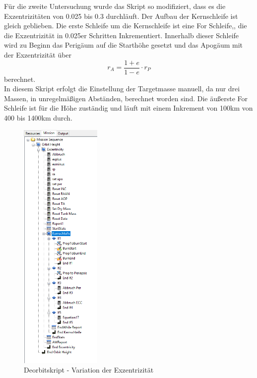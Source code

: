 Für die zweite Untersuchung wurde das Skript so modifiziert, dass es die Exzentrizitäten von 0.025 bis 0.3 durchläuft.
Der Aufbau der Kernschleife ist gleich geblieben. Die erste Schleife um die Kernschleife ist eine For Schleife,, die die Exzentrizität in 0.025er Schritten Inkrementiert. Innerhalb dieser Schleife wird zu Beginn das Perigäum auf die Starthöhe gesetzt und das Apogäum mit der Exzentrizität über
\begin{equation}
r_A = \frac{1+e}{1-e}\cdot r_P
\label{apoapsis}
\end{equation}
berechnet.\\
In diesem Skript erfolgt die Einstellung der Targetmasse manuell, da nur drei Massen, in unregelmäßigen Abständen, berechnet worden sind. Die äußerste For Schleife ist für die Höhe zuständig und läuft mit einem Inkrement von 100km von 400 bis 1400km durch.
\begin{figure}[!h]
	\centering
		\includegraphics[width=0.35\textwidth]{graphics/GMAT/GMAT_Skript_ECC.PNG}
	\caption{Deorbitskript - Variation der Exzentrizität}
	\label{fig:GMAT_Skript_ECC}
\end{figure}



\newpage

